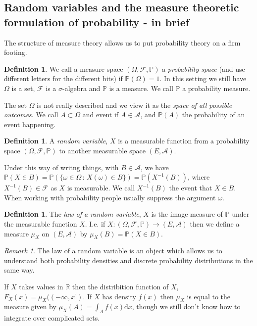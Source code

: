 \documentclass[11pt]{article}
\theoremstyle{definition}
\newtheorem{dfn}[thm]{Definition}
\theoremstyle{remark}
\newtheorem{remark}[thm]{Remark}
\begin{document}
\subsection{Random variables and the measure theoretic formulation of probability - in brief}
The structure of measure theory allows us to put probability theory on a firm footing. 
\begin{dfn}
We call a measure space $(\Omega, \mathcal{F}, \mathbb{P})$ a \emph{probability space} (and use different letters for the different bits) if $\mathbb{P}(\Omega) = 1$. In this setting we still have $\Omega$ is a set, $\mathcal{F}$ is a $\sigma$-algebra and $\mathbb{P}$ is a measure. We call $\mathbb{P}$ a probability measure. 
\end{dfn}
The set $\Omega$ is not really described and we view it as the \emph{space of all possible outcomes}. We call $A \subset \Omega$ and event if $A \in \mathcal{A}$, and $\mathbb{P}(A)$ the probability of an event happening. 

\begin{dfn}
A \emph{random variable}, $X$ is a measurable function from a probability space $(\Omega, \mathcal{F}, \mathbb{P})$ to another measurable space $(E, \mathcal{A})$.
\end{dfn}
Under this way of writng things, with $B \in \mathcal{A}$, we have $\mathbb{P}(X \in B) = \mathbb{P}(\{ \omega \in \Omega \,:\, X(\omega) \in B\}) = \mathbb{P}( X^{-1}(B))$, where $X^{-1}(B) \in \mathcal{F}$ as $X$ is measurable. We call $X^{-1}(B)$ the event that $X \in B$. When working with probability people usually suppress the argument $\omega$.

\begin{dfn}
The \emph{law of a random variable}, $X$ is the image measure of $\mathbb{P}$ under the measurable function $X$. I.e. if $X: (\Omega, \mathcal{F}, \mathbb{P}) \rightarrow (E, \mathcal{A})$ then we define a measure $\mu_X$ on $(E, \mathcal{A})$ by $\mu_X(B) = \mathbb{P}(X \in B)$.
\end{dfn}
\begin{remark}
The law of a random variable is an object which allows us to understand both probability densities and discrete probability distributions in the same way.

If $X$ takes values in $\mathbb{R}$ then the distribition function of $X$, $F_X(x) = \mu_X((-\infty, x])$. If $X$ has density $f(x)$ then $\mu_X$ is equal to the measure given by $\mu_X(A) = \int_A f(x) \mathrm{d}x$, though we still don't know how to integrate over complicated sets.
\end{remark}
\end{document}
